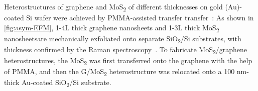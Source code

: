 Heterostructures of graphene and MoS\textsubscript{2} of different thicknesses on gold (Au)-coated Si wafer were achieved by PMMA-assisted transfer
transfer~\autocite{Minemawari_2011_inkjet_PMMA}:
%
As shown in \autoref{fig:asym-EFM}, 1-4L thick graphene nanosheets and 1-3L
thick MoS\textsubscript{2} nanosheetsare mechanically exfoliated onto
separate SiO\textsubscript{2}/Si substrates, with thickness confirmed
by the Raman
spectroscopy~\autocite{Ferrari_2006_raman,Lee_2010_anomal_raman_mos2,Chakraborty_2012_mos2_layer_raman}.
%
To fabricate MoS\textsubscript{2}/graphene heterostructures, the
MoS\textsubscript{2} was first transferred onto the graphene with the
help of PMMA, and then the G/MoS\textsubscript{2} hetero\-structure
was relocated onto a 100 nm-thick Au-coated SiO\textsubscript{2}/Si
substrate.
%

